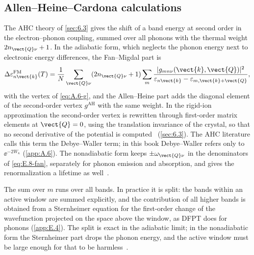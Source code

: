 \subsection{Allen--Heine--Cardona calculations}

The AHC theory of \cref{sec:6.3} gives the shift of a band energy at second order in the electron--phonon coupling, summed over all phonons with the thermal weight $2n_{\vect{Q}\nu} + 1$. In the adiabatic form, which neglects the phonon energy next to electronic energy differences, the Fan--Migdal part is
\begin{equation}
  \Delta\varepsilon^{\mathrm{FM}}_{n\vect{k}}(T) = \frac{1}{N}\sum_{\vect{Q}\nu}(2n_{\vect{Q}\nu} + 1)\sum_m\frac{|g_{mn\nu}(\vect{k},\vect{Q})|^2}{\varepsilon_{n\vect{k}} - \varepsilon_{m,\vect{k}+\vect{Q}}} ,
  \label{eq:E.8-fan}
\end{equation}
with the vertex of \cref{eq:A.6-g}, and the Allen--Heine part adds the diagonal element of the second-order vertex $g^{\mathrm{AH}}$ with the same weight. In the rigid-ion approximation the second-order vertex is rewritten through first-order matrix elements at $\vect{Q} = 0$, using the translation invariance of the crystal, so that no second derivative of the potential is computed~\cite[Eqs.~(11) and~(15)]{ponce2015temperature} (\cref{sec:6.3}). The AHC literature calls this term the Debye--Waller term; in this book Debye--Waller refers only to $\ee^{-2W_\kappa}$ (\cref{app:A.6}). The nonadiabatic form keeps $\pm\omega_{\vect{Q}\nu}$ in the denominators of \cref{eq:E.8-fan}, separately for phonon emission and absorption, and gives the renormalization a lifetime as well~\cite[Eq.~(16)]{ponce2015temperature}.

The sum over $m$ runs over all bands. In practice it is split: the bands within an active window are summed explicitly, and the contribution of all higher bands is obtained from a Sternheimer equation for the first-order change of the wavefunction projected on the space above the window, as DFPT does for phonons (\cref{app:E.4}). The split is exact in the adiabatic limit; in the nonadiabatic form the Sternheimer part drops the phonon energy, and the active window must be large enough for that to be harmless~\cite[below Eq.~(16)]{ponce2015temperature}.

